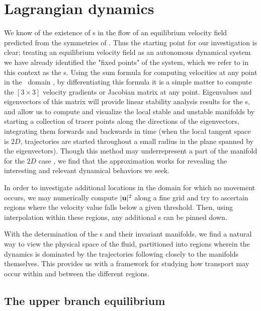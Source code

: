 \documentclass[lineno]{jfm}
\begin{document}
\section{Lagrangian dynamics}
\label{s:Lagrangian}

We know of the existence of  \stagp s in the flow of an equilibrium 
velocity field predicted from the symmetries of \pCf. Thus the starting 
point for our investigation is clear; treating an equilibrium velocity 
field as an autonomous dynamical system we have already identified the 
"fixed points" of the system, which we refer to in this context as the 
\stagp s.  Using the sum formula for computing velocities at any point in 
the \pCf\ domain , by differentiating this formula 
it is a simple matter to compute the $[3\!\times\! 3]$ velocity gradients 
or Jacobian matrix at any point. Eigenvalues and eigenvectors of this 
matrix will provide linear stability analysis results for the {\stagp}s, 
and allow us to compute and visualize the local stable and unstable 
manifolds by starting a collection of tracer points along the directions 
of the eigenvectors, integrating them forwards and backwards in time 
(when the local tangent space is $2D$, trajectories are started 
throughout a small radius in the plane spanned by the eigenvectors). 
Though this method may underrepresent a part of the manifold for the $2D$ 
case \citep{SahVla09}, we find that the approximation works for revealing 
the interesting and relevant dynamical behaviors we seek. 

In order to investigate additional locations in the domain for which no 
movement occurs, we may numerically compute $|{\bf u}|^{2}$ along a fine grid 
and try to ascertain regions where the velocity value falls below a given 
threshold. Then, using interpolation within these regions, any additional  
\stagp s can be pinned down. 

With the determination of the {\stagp}s and their invariant manifolds, we 
find a natural way to view the physical space of the fluid, partitioned 
into regions wherein the dynamics is dominated by the trajectories 
following closely to the manifolds themselves. This provides us with a 
framework for studying how transport may occur within and between the 
different regions. 

\subsection{The upper branch equilibrium}
\label{s:eq2}
\end{document}

